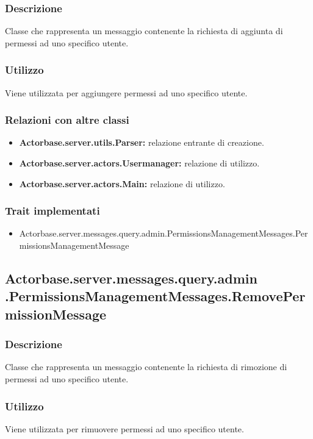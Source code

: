 \documentclass[a4paper]{article}
\begin{document}
			\subsubsection{Descrizione}
				Classe che rappresenta un messaggio contenente la richiesta di aggiunta di permessi ad uno specifico utente.
				
			\subsubsection{Utilizzo}
				Viene utilizzata per aggiungere permessi ad uno specifico utente.
				
			\subsubsection{Relazioni con altre classi}
				\begin{itemize}
					\item \textbf{Actorbase.server.utils.Parser:} relazione entrante di creazione.
					\item \textbf{Actorbase.server.actors.Usermanager:} relazione di utilizzo.
					\item \textbf{Actorbase.server.actors.Main:} relazione di utilizzo.
				\end{itemize}
			\subsubsection{Trait implementati}
				\begin{itemize}
					\item Actorbase.server.messages.query.admin.PermissionsManagementMessages.PermissionsManagementMessage
				\end{itemize}
		
		\subsection{Actorbase.server.messages.query.admin \newline
		.PermissionsManagementMessages.RemovePermissionMessage}
			\subsubsection{Descrizione}
				Classe che rappresenta un messaggio contenente la richiesta di rimozione di permessi ad uno specifico utente.
				
			\subsubsection{Utilizzo}
				Viene utilizzata per rimuovere permessi ad uno specifico utente.
				
\end{document}
